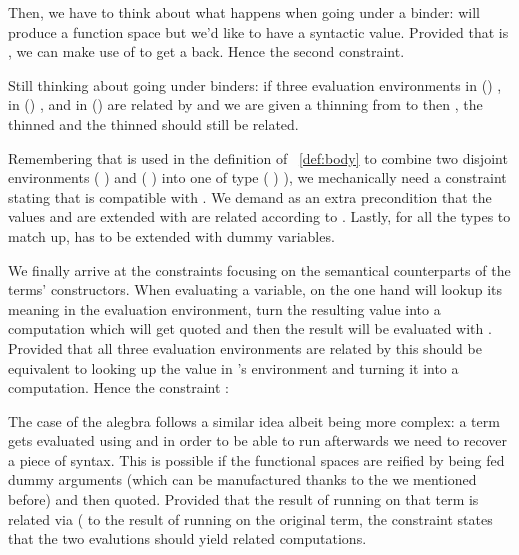 
Then, we have to think about what happens when going under a binder: 
will produce a  function space but we'd like to have a syntactic
value. Provided that  is , we can make use of 
to get a  back. Hence the second constraint.


Still thinking about going under binders: if three evaluation environments
 in {(\Gamma {})  \Delta},  in
{(\Delta {})  \Theta}, and  in {(\Gamma {})  \Theta}
are related by  and we are given a thinning \AB{\sigma} from \Theta to \Omega
then , the thinned  and the thinned  should still be related.


Remembering that \AF{\_>>\_} is used in the definition of ~\ref{def:body} to
combine two disjoint environments {( )  } and
{( )  } into one of type
{( \AF{++}  )  )}, we mechanically need a
constraint stating that \AF{\_>>\_} is compatible with . We demand
as an extra precondition that the values  and  are extended
with are related according to . Lastly, for all the types to match up,
 has to be extended with dummy variables.


We finally arrive at the constraints focusing on the semantical counterparts
of the terms' constructors. When evaluating a variable, on the one hand 
will lookup its meaning in the evaluation environment, turn the resulting value into
a computation which will get quoted and then the result will be evaluated with .
Provided that all three evaluation environments are related by  this should
be equivalent to looking up the value in 's environment and turning it into a
computation. Hence the constraint :


The case of the alegbra follows a similar idea albeit being more complex:
a term gets evaluated using  and in order to be able to run 
afterwards we need to recover a piece of syntax. This is possible if the
 functional spaces are reified by being fed dummy  arguments
(which can be manufactured thanks to the  we mentioned before) and
then quoted. Provided that the result of running  on that term is
related via {  (  } to the result
of running  on the original term, the  constraint states
that the two evalutions should yield related computations.

